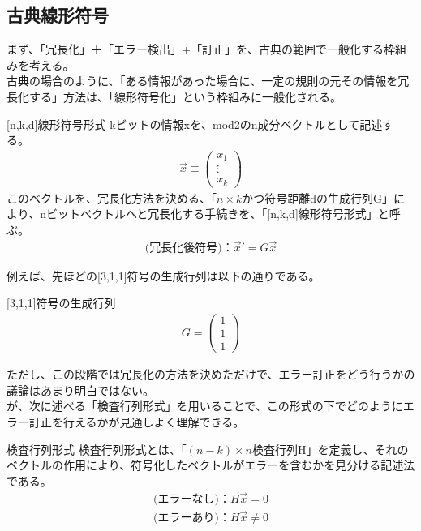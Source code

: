 \documentclass[a4paper,10.5pt]{article}
\numberwithin{equation}{section}
\begin{document}
\subsection{古典線形符号}
まず、「冗長化」＋「エラー検出」+「訂正」を、古典の範囲で一般化する枠組みを考える。\\
古典の場合のように、「ある情報があった場合に、一定の規則の元その情報を冗長化する」方法は、「線形符号化」という枠組みに一般化される。
\begin{defbox}{[n,k,d]線形符号形式}
kビットの情報xを、mod2のn成分ベクトルとして記述する。
\begin{align*}
    \vec{x}\equiv \begin{pmatrix}
 x_{1} \\ \vdots \\ x_{k} 
\end{pmatrix}
\end{align*}
このベクトルを、冗長化方法を決める、「$n\times k$かつ符号距離dの生成行列G」により、nビットベクトルへと冗長化する手続きを、「[n,k,d]線形符号形式」と呼ぶ。
\begin{align*}
    \text{(冗長化後符号)：}\vec{x}'=G\vec{x}
\end{align*}
\end{defbox}
例えば、先ほどの[3,1,1]符号の生成行列は以下の通りである。
\begin{examplebox}{[3,1,1]符号の生成行列}
\begin{align*}
        G=\begin{pmatrix}
         1 \\ 1 \\ 1 
        \end{pmatrix}
    \end{align*}
\end{examplebox}
ただし、この段階では冗長化の方法を決めただけで、エラー訂正をどう行うかの議論はあまり明白ではない。\\
が、次に述べる「検査行列形式」を用いることで、この形式の下でどのようにエラー訂正を行えるかが見通しよく理解できる。\\
\begin{defbox}{検査行列形式}
検査行列形式とは、「$(n-k)\times n$検査行列H」を定義し、それのベクトルの作用により、符号化したベクトルがエラーを含むかを見分ける記述法である。
\begin{align*}
    \text{(エラーなし)：}H\vec{x}=0\\
    \text{(エラーあり)：}H\vec{x}\neq0
\end{align*}
\end{defbox}
\end{document}
